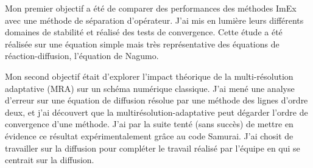 Mon premier objectif a été de comparer des performances des méthodes ImEx avec une méthode de séparation d'opérateur.
J'ai mis en lumière leurs différents domaines de stabilité et réalisé des tests de convergence. Cette étude a été réalisée sur une équation simple mais très représentative des équations de réaction-diffusion,
l'équation de Nagumo.\par%
Mon second objectif était d'explorer l'impact théorique de la multi-résolution adaptative (MRA) sur un schéma numérique classique.
J'ai mené une analyse d'erreur sur une équation de diffusion résolue par une méthode des lignes d'ordre deux, et j'ai découvert %
que la multirésolution-adaptative peut dégarder l'ordre de convergence d'une méthode. J'ai par la suite tenté (sans succès) de mettre en 
évidence ce résultat expérimentalement grâce au code Samurai. J'ai chosit de travailler sur la diffusion pour compléter le travail 
réalisé par l'équipe en \cite{belloti_et_al_2025} qui se centrait sur la diffusion.